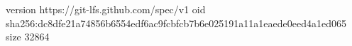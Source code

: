 version https://git-lfs.github.com/spec/v1
oid sha256:dc8dfe21a74856b6554edf6ac9fcbfcb7b6e025191a11a1eaede0eed4a1ed065
size 32864

